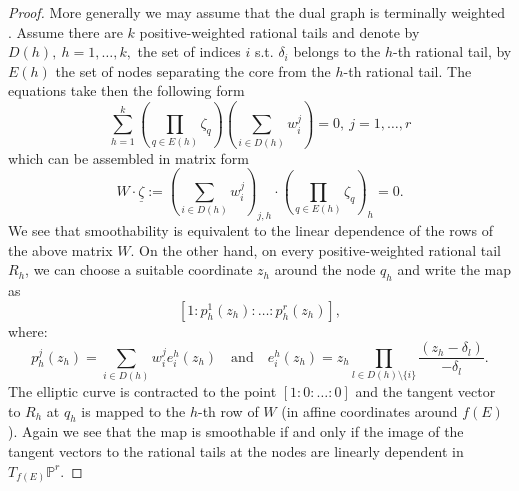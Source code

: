 \documentclass[11pt]{amsart}
\newcommand{\PP}{\mathbb P}
\renewcommand{\to}{\rightarrow}
\newcommand{\bcd}{\begin{center}\begin{tikzcd}}
\newcommand{\ecd}{\end{tikzcd}\end{center}}
\theoremstyle{plain}
\theoremstyle{definition}
\begin{document}
\begin{proof}
 More generally we may assume that the dual graph is terminally weighted \cite[\S 3.1]{HL}. Assume there are $k$ positive-weighted rational tails and denote by $D(h),\ h=1,\ldots,k,$ the set of indices $i$ s.t. $\delta_i$ belongs to the $h$-th rational tail, by $E(h)$ the set of nodes separating the core from the $h$-th rational tail. The equations take then the following form
 $$\sum_{h=1}^k(\prod_{q\in E(h)}\zeta_q)(\sum_{i\in D(h)}w_i^j)=0,\ j=1,\ldots,r$$
 which can be assembled in matrix form
 $$W\cdot\underline\zeta:=(\sum_{i\in D(h)}w_i^j)_{j,h}\cdot(\prod_{q\in E(h)}\zeta_q)_h=0.$$
 We see that smoothability is equivalent to the linear dependence of the rows of the above matrix $W$. On the other hand, on every positive-weighted rational tail $R_h$, we can choose a suitable coordinate $z_h$ around the node $q_h$ and write the map as $$[1:p_h^1(z_h):\ldots:p_h^r(z_h)],$$ where: \[p_h^j(z_h)=\sum_{i\in D(h)}w_i^je_i^h(z_h) \quad \text{and} \quad e_i^h(z_h)=z_h\prod_{l\in D(h)\setminus\{i\}}\frac{(z_h-\delta_l)}{-\delta_l}.\] The elliptic curve is contracted to the point $[1:0:\ldots:0]$ and the tangent vector to $R_h$ at $q_h$ is mapped to the $h$-th row of $W$ (in affine coordinates around $f(E)$). Again we see that the map is smoothable if and only if the image of the tangent vectors to the rational tails at the nodes are linearly dependent in $T_{f(E)}\PP^r$.

\end{proof}
\end{document}
